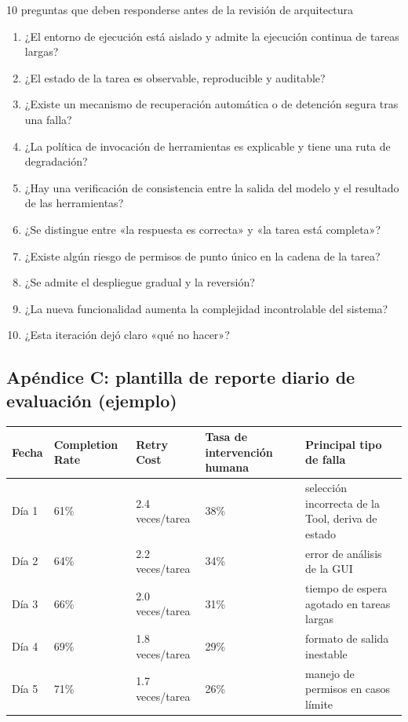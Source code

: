 \documentclass[a4paper]{article}
\begin{document}
\begin{importantbox}{10 preguntas que deben responderse antes de la revisión de arquitectura}
\begin{enumerate}
    \item ¿El entorno de ejecución está aislado y admite la ejecución continua de tareas largas?
    \item ¿El estado de la tarea es observable, reproducible y auditable?
    \item ¿Existe un mecanismo de recuperación automática o de detención segura tras una falla?
    \item ¿La política de invocación de herramientas es explicable y tiene una ruta de degradación?
    \item ¿Hay una verificación de consistencia entre la salida del modelo y el resultado de las herramientas?
    \item ¿Se distingue entre «la respuesta es correcta» y «la tarea está completa»?
    \item ¿Existe algún riesgo de permisos de punto único en la cadena de la tarea?
    \item ¿Se admite el despliegue gradual y la reversión?
    \item ¿La nueva funcionalidad aumenta la complejidad incontrolable del sistema?
    \item ¿Esta iteración dejó claro «qué no hacer»?
\end{enumerate}
\end{importantbox}

\subsection{Apéndice C: plantilla de reporte diario de evaluación (ejemplo)}

\begin{center}
\begin{tabular}{p{2.8cm}p{2.5cm}p{2.5cm}p{2.8cm}p{3.5cm}}
\toprule
Fecha & Completion Rate & Retry Cost & Tasa de intervención humana & Principal tipo de falla \\
\midrule
Día 1 & 61\% & 2.4 veces/tarea & 38\% & selección incorrecta de la Tool, deriva de estado \\
Día 2 & 64\% & 2.2 veces/tarea & 34\% & error de análisis de la GUI \\
Día 3 & 66\% & 2.0 veces/tarea & 31\% & tiempo de espera agotado en tareas largas \\
Día 4 & 69\% & 1.8 veces/tarea & 29\% & formato de salida inestable \\
Día 5 & 71\% & 1.7 veces/tarea & 26\% & manejo de permisos en casos límite \\
\bottomrule
\end{tabular}
\end{center}
\end{document}
